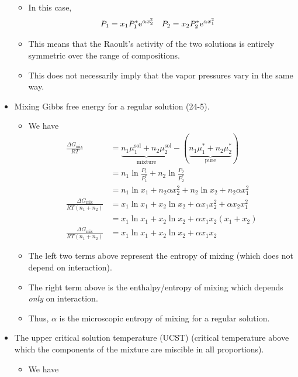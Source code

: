 \documentclass[../notes.tex]{subfiles}
\begin{document}
\begin{itemize}
    \begin{itemize}
        \item In this case,
        \begin{align*}
            P_1 &= x_1P_1^*\e[\alpha x_2^2]&
            P_2 &= x_2P_2^*\e[\alpha x_1^2]
        \end{align*}
        \item This means that the Raoult's activity of the two solutions is entirely symmetric over the range of compositions.
        \item This does not necessarily imply that the vapor pressures vary in the same way.
    \end{itemize}
    \item Mixing Gibbs free energy for a regular solution (24-5).
    \begin{itemize}
        \item We have
        \begin{align*}
            \frac{\Delta G_\text{mix}}{RT} &= \underbrace{n_1\mu_1^\text{sol}+n_2\mu_2^\text{sol}}_\text{mixture}-(\underbrace{n_1\mu_1^*+n_2\mu_2^*}_\text{pure})\\
            &= n_1\ln\frac{P_1}{P_1^*}+n_2\ln\frac{P_2}{P_2^*}\\
            &= n_1\ln x_1+n_2\alpha x_2^2+n_2\ln x_2+n_2\alpha x_1^2\\
            \frac{\Delta G_\text{mix}}{RT(n_1+n_2)} &= x_1\ln x_1+x_2\ln x_2+\alpha x_1x_2^2+\alpha x_2x_1^2\\
            &= x_1\ln x_1+x_2\ln x_2+\alpha x_1x_2(x_1+x_2)\\
            \frac{\Delta G_\text{mix}}{RT(n_1+n_2)} &= x_1\ln x_1+x_2\ln x_2+\alpha x_1x_2
        \end{align*}
        \item The left two terms above represent the entropy of mixing (which does not depend on interaction).
        \item The right term above is the enthalpy/entropy of mixing which depends \emph{only} on interaction.
        \item Thus, $\alpha$ is the microscopic entropy of mixing for a regular solution.
    \end{itemize}
    \item The upper critical solution temperature (UCST) (critical temperature above which the components of the mixture are miscible in all proportions).
    \begin{itemize}
        \item We have

\end{itemize}
\end{itemize}
\end{document}
